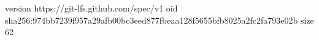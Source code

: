 version https://git-lfs.github.com/spec/v1
oid sha256:974bb7239f957a29afb00bc3eed877fbeaa128f5655bfb8025a2fc2fa793e02b
size 62
